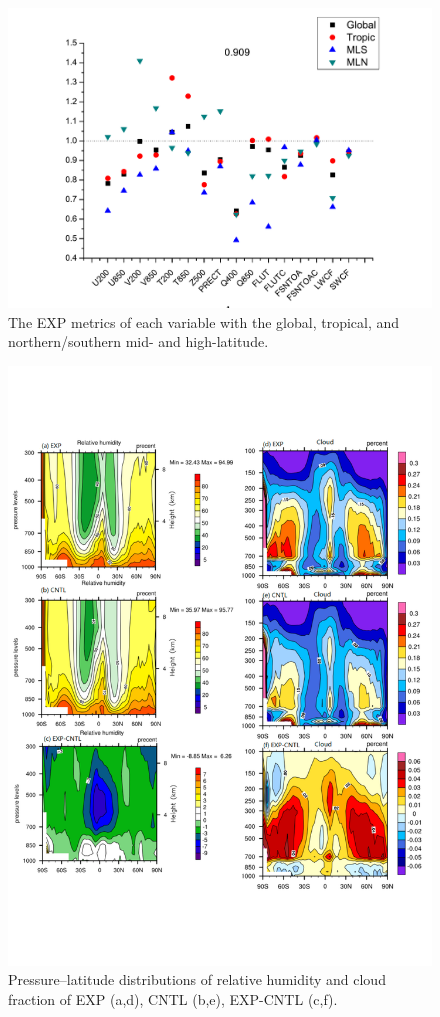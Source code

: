 \documentclass[gmd, manuscript]{copernicus}
\begin{document}
\begin{figure}[t]
\includegraphics[width=15.3cm]{reg}
\caption{The EXP metrics of each variable with the global, tropical, and northern/southern mid- and high-latitude.}
\end{figure}

\begin{figure}[t]
\includegraphics[width=15.3cm]{cloud-rh}
\caption{Pressure--latitude distributions of relative humidity and cloud fraction of EXP (a,d), CNTL (b,e), EXP-CNTL (c,f).}
\end{figure}
\end{document}
